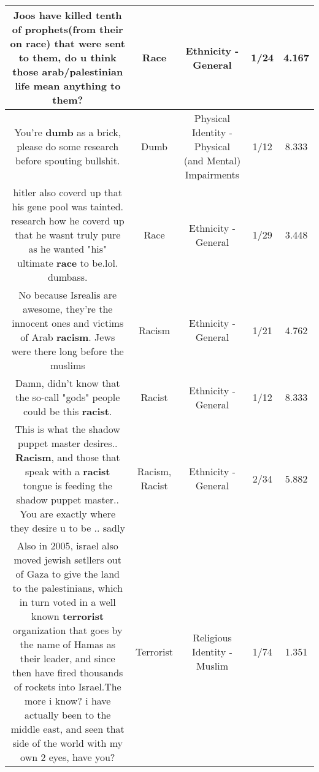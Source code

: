 \documentclass[11pt]{article}
\newlength\mylength
\begin{document}
\begin{center}
\begin{longtable}{|C{.65\mylength}|C{.30\mylength}|C{.12\mylength}|C{.12\mylength}|C{.12\mylength}|}
  \small Joos have killed tenth of prophets(from their on \textbf{race}) that were sent to them, do u think those arab/palestinian life mean anything to them?\normalsize   & Race & Ethnicity - General & 1/24 & 4.167 \\  \hline
  \small You're \textbf{dumb} as a brick, please do some research before spouting bullshit.\normalsize   & Dumb & Physical Identity - Physical (and Mental) Impairments & 1/12 & 8.333 \\  \hline
  \small hitler also coverd up that his gene pool was tainted. research how he coverd up that he wasnt truly pure as he wanted "his" ultimate \textbf{race} to be.lol. dumbass.\normalsize   & Race & Ethnicity - General & 1/29 & 3.448 \\  \hline
  \small No because Isrealis are awesome, they're the innocent ones and victims of Arab \textbf{racism}. Jews were there long before the muslims\normalsize   & Racism & Ethnicity - General & 1/21 & 4.762 \\  \hline
  \small Damn, didn't know that the so-call "gods" people could be this \textbf{racist}.\normalsize   & Racist & Ethnicity - General & 1/12 & 8.333 \\  \hline
  \small This is what the shadow puppet master desires.. \textbf{Racism}, and those that speak with a \textbf{racist} tongue is feeding the shadow puppet master.. You are exactly where they desire u to be .. sadly\normalsize   & Racism, Racist & Ethnicity - General & 2/34 & 5.882 \\  \hline
  \small Also in 2005, israel also moved jewish setllers out of Gaza to give the land to the palestinians, which in turn voted in a well known \textbf{terrorist} organization that goes by the name of Hamas as their leader, and since then have fired thousands of rockets into Israel.The more i know? i have actually been to the middle east, and seen that side of the world with my own 2 eyes, have you?\normalsize   & Terrorist & Religious Identity - Muslim & 1/74 & 1.351 \\  \hline

\end{longtable}
\end{center}
\end{document}
